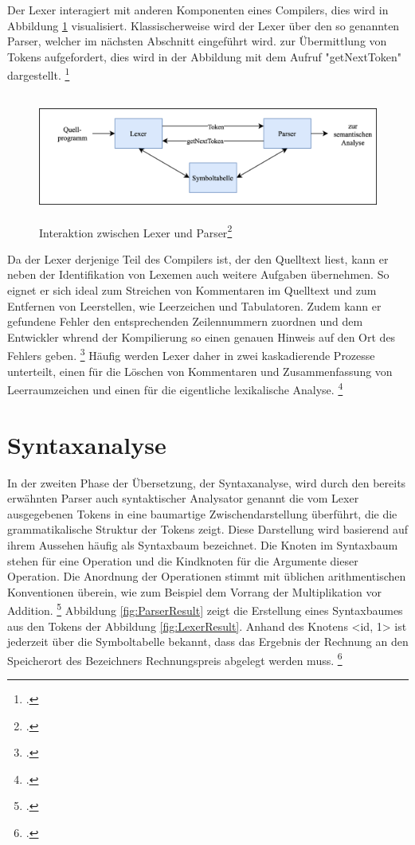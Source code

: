 Der Lexer interagiert mit anderen Komponenten eines Compilers,  dies wird in Abbildung \ref{fig:LexerInteraktionen} visualisiert.  Klassischerweise wird der Lexer über den so genannten Parser, welcher im nächsten Abschnitt eingeführt wird.  zur Übermittlung von Tokens aufgefordert,  dies wird in der Abbildung mit dem Aufruf "getNextToken" dargestellt.  \footcite[Vgl.][S. 135]{Ullmann2008} 

\begin{figure}[!ht]
 \includegraphics[width=14.5cm,height=4.11cm]{Images/Compiler/LexerParser.png}
 \caption[Interaktion zwischen Lexer und Parser]{Interaktion zwischen Lexer und Parser\protect\footcite{Ullmann2008}}
 \label{fig:LexerInteraktionen}
\end{figure}

Da der Lexer derjenige Teil des Compilers ist, der den Quelltext liest, kann er neben der Identifikation von Lexemen auch weitere Aufgaben übernehmen. So eignet er sich ideal zum Streichen von Kommentaren im Quelltext und zum Entfernen von Leerstellen,  wie Leerzeichen und Tabulatoren.  Zudem kann er gefundene Fehler den entsprechenden Zeilennummern zuordnen und dem Entwickler whrend der Kompilierung so einen genauen Hinweis auf den Ort des Fehlers geben.  \footcite[Vgl.][S. 135.]{Ullmann2008} 
Häufig werden Lexer daher in zwei kaskadierende Prozesse unterteilt, einen für die Löschen von Kommentaren und Zusammenfassung von Leerraumzeichen und einen für die eigentliche lexikalische Analyse.  \footcite[Vgl.][S. 136.]{Ullmann2008} 

\section{Syntaxanalyse}
In der zweiten Phase der Übersetzung, der Syntaxanalyse, wird durch den bereits erwähnten Parser auch syntaktischer Analysator genannt die vom Lexer ausgegebenen Tokens in eine baumartige Zwischendarstellung überführt, die die grammatikalische Struktur der Tokens zeigt.  Diese Darstellung wird basierend auf ihrem Aussehen häufig als Syntaxbaum bezeichnet.  Die Knoten im Syntaxbaum stehen für eine Operation und die Kindknoten für die Argumente dieser Operation.  Die Anordnung der Operationen stimmt mit üblichen arithmentischen Konventionen überein,  wie zum Beispiel dem Vorrang der Multiplikation vor Addition. \footcite[Vgl.][S. 9]{Ullmann2008} Abbildung \ref{fig:ParserResult} zeigt die Erstellung eines Syntaxbaumes aus den Tokens  der Abbildung  \ref{fig:LexerResult}.  Anhand des Knotens <id, 1> ist jederzeit über die Symboltabelle bekannt,  dass das Ergebnis der Rechnung an den Speicherort des Bezeichners Rechnungspreis abgelegt werden muss. \footcite[Vgl.][S. 9.]{Ullmann2008} 

